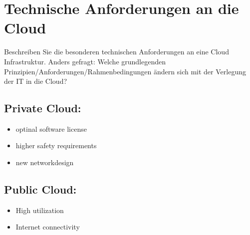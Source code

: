 \documentclass[a4,12pt]{scrartcl}
\begin{document}
\section{Technische Anforderungen an die Cloud}
Beschreiben Sie die besonderen technischen Anforderungen an eine Cloud Infrastruktur. Anders gefragt: Welche grundlegenden Prinzipien/Anforderungen/Rahmenbedingungen ändern sich mit der Verlegung der IT in die Cloud?

\subsection{Private Cloud:}
\begin{itemize}
\item optinal software license
\item higher safety requirements
\item new networkdesign
\end{itemize}

\subsection{Public Cloud:}
\begin{itemize}
\item High utilization
\item Internet connectivity
\end{itemize}
\end{document}
